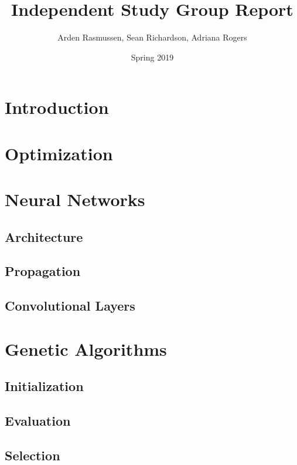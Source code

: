 \documentclass{amsart}
\title{Independent Study Group Report}
\author{Arden Rasmussen, Sean Richardson, Adriana Rogers }
\date{Spring 2019}
\begin{document}
\maketitle

\section{Introduction}

\section{Optimization}

\section{Neural Networks}

\subsection{Architecture}

\subsection{Propagation}

\subsection{Convolutional Layers}

\section{Genetic Algorithms}

\subsection{Initialization}

\subsection{Evaluation}

\subsection{Selection}
\end{document}
